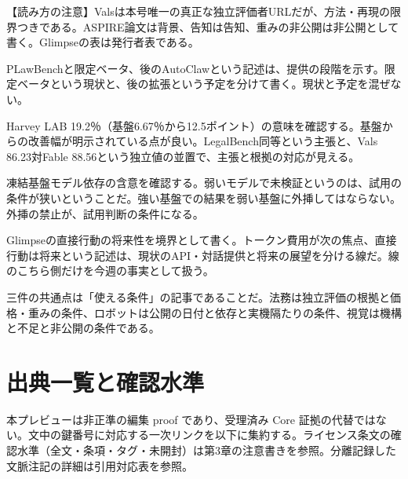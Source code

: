 \documentclass[lualatex,a4paper,10pt]{jlreq}
\begin{document}
\begin{tcolorbox}[colback=SurveySoft,colframe=SurveyRule,arc=1mm,boxrule=0.4pt,left=2mm,right=2mm]
【読み方の注意】Valsは本号唯一の真正な独立評価者URLだが、方法・再現の限界つきである。ASPIRE論文は背景、告知は告知、重みの非公開は非公開として書く。Glimpseの表は発行者表である。
\end{tcolorbox}
\cite{B55,B53,B54,B57,B56,B58,B59,B88}


PLawBenchと限定ベータ、後のAutoClawという記述は、提供の段階を示す。限定ベータという現状と、後の拡張という予定を分けて書く。現状と予定を混ぜない。
\cite{B55,B53,B54}


Harvey LAB 19.2％（基盤6.67％から12.5ポイント）の意味を確認する。基盤からの改善幅が明示されている点が良い。LegalBench同等という主張と、Vals 86.23対Fable 88.56という独立値の並置で、主張と根拠の対応が見える。
\cite{B55,B53,B54}


凍結基盤モデル依存の含意を確認する。弱いモデルで未検証というのは、試用の条件が狭いということだ。強い基盤での結果を弱い基盤に外挿してはならない。外挿の禁止が、試用判断の条件になる。
\cite{B57,B56}


Glimpseの直接行動の将来性を境界として書く。トークン費用が次の焦点、直接行動は将来という記述は、現状のAPI・対話提供と将来の展望を分ける線だ。線のこちら側だけを今週の事実として扱う。
\cite{B58,B59,B88}


三件の共通点は「使える条件」の記事であることだ。法務は独立評価の根拠と価格・重みの条件、ロボットは公開の日付と依存と実機隔たりの条件、視覚は機構と不足と非公開の条件である。
\cite{B55,B53,B54,B57,B56,B58,B59,B88}


\onecolumn
\section*{出典一覧と確認水準}
本プレビューは非正準の編集 proof であり、受理済み Core 証拠の代替ではない。文中の鍵番号に対応する一次リンクを以下に集約する。ライセンス条文の確認水準（全文・条項・タグ・未開封）は第3章の注意書きを参照。分離記録した文脈注記の詳細は引用対応表を参照。
\end{document}
